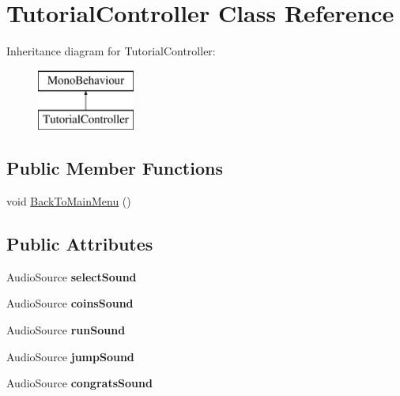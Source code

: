 \hypertarget{class_tutorial_controller}{}\section{Tutorial\+Controller Class Reference}
\label{class_tutorial_controller}
Inheritance diagram for Tutorial\+Controller\+:\begin{figure}[H]
\begin{center}
\leavevmode
\includegraphics[height=2.000000cm]{class_tutorial_controller}
\end{center}
\end{figure}
\subsection*{Public Member Functions}
\begin{DoxyCompactItemize}
\item 
void \mbox{\hyperlink{class_tutorial_controller_a25f06b28b2ae32c528f117bf65f752f5}{Back\+To\+Main\+Menu}} ()
\end{DoxyCompactItemize}
\subsection*{Public Attributes}
\begin{DoxyCompactItemize}
\item 
\mbox{\label{class_tutorial_controller_afb35760e1e04d30087348d98ebbb1cd8}} 
Audio\+Source {\bfseries select\+Sound}
\item 
\mbox{\label{class_tutorial_controller_a93d2560a9bb73c4ca5ed7acefbc7bad6}} 
Audio\+Source {\bfseries coins\+Sound}
\item 
\mbox{\label{class_tutorial_controller_afdc3a5717eca0df1df42d8a060fcea0a}} 
Audio\+Source {\bfseries run\+Sound}
\item 
\mbox{\label{class_tutorial_controller_a4185ada6d43a61aa3d3babdc6d9d00eb}} 
Audio\+Source {\bfseries jump\+Sound}
\item 
\mbox{\label{class_tutorial_controller_a34bee2077380b3cb708710c448ac722e}} 
Audio\+Source {\bfseries congrats\+Sound}
\end{DoxyCompactItemize}
